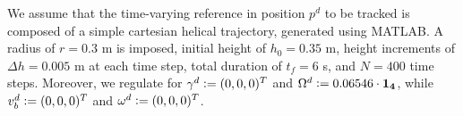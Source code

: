 We assume that the time-varying reference in position $p^d$ to be tracked is composed of a simple cartesian helical trajectory, generated using MATLAB. A radius of $r = 0.3$ m is imposed, initial height of $h_0 = 0.35$ m, height increments of $\Delta h = 0.005$ m at each time step, total duration  of $t_f = 6$ s, and $N = 400$ time steps. Moreover, we regulate for $\gamma^d \vcentcolon = (0,0,0)^T$ and $\Omega^d  \vcentcolon = 0.06546\cdot\mathbf{1_4}$, while $v_b^d  \vcentcolon = (0,0,0)^T$ and $\omega^d  \vcentcolon = (0,0,0)^T$.